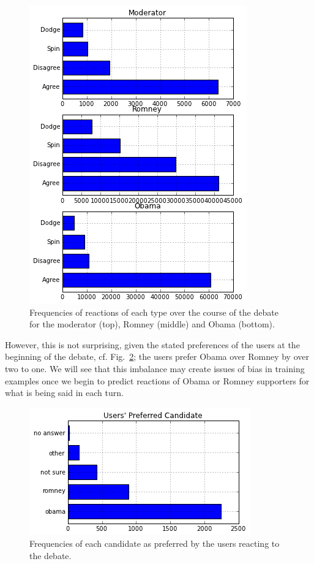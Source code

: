 \begin{figure}[]
	\centering
	\includegraphics[scale=0.5]{Figures/kinds_of_reactions_to_speakers}
	\caption{Frequencies of reactions of each type over the course of the debate for the moderator (top), Romney (middle) and Obama (bottom).}
	\label{fig:kinds_of_reactions_to_speakers}
\end{figure}

However, this is not surprising, given the stated preferences of the users at the beginning of the debate, cf. Fig.~\ref{fig:preferred_candidates}; the users prefer Obama over Romney by over two to one.  We will see that this imbalance may create issues of bias in training examples once we begin to predict reactions of Obama or Romney supporters for what is being said in each turn.

\begin{figure}[]
	\centering
	\includegraphics[scale=0.5]{Figures/preferred_candidates}
	\caption{Frequencies of each candidate as preferred by the users reacting to the debate.}
	\label{fig:preferred_candidates}
\end{figure}



